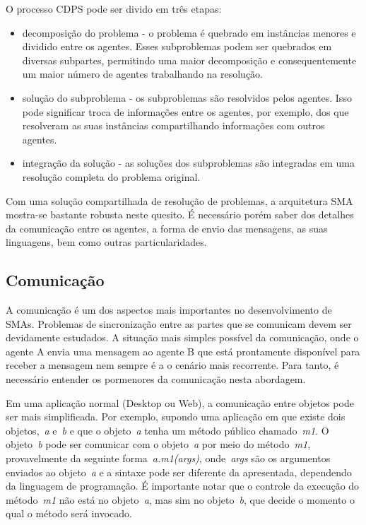O processo CDPS pode ser divido em três etapas:
\begin{itemize}
	\item decomposição do problema - o problema é quebrado em instâncias menores e dividido entre os agentes. Esses subproblemas podem ser quebrados em diversas subpartes, permitindo uma maior decomposição e consequentemente um maior número de agentes trabalhando na resolução.
	\item solução do subproblema - os subproblemas são resolvidos pelos agentes. Isso pode significar troca de informações entre os agentes, por exemplo, dos que resolveram as suas instâncias compartilhando informações com outros agentes.
	\item integração da solução - as soluções dos subproblemas são integradas em uma resolução completa do problema original.
\end{itemize}

Com uma solução compartilhada de resolução de problemas, a arquitetura SMA mostra-se bastante robusta neste quesito. É necessário porém saber dos detalhes da comunicação entre os agentes, a forma de envio das mensagens, as suas linguagens, bem como outras particularidades.

\subsection{Comunicação}

A comunicação é um dos aspectos mais importantes no desenvolvimento de SMAs. Problemas de sincronização entre as partes que se comunicam devem ser devidamente estudados. A situação mais simples possível da comunicação, onde o agente A envia uma mensagem ao agente B que está prontamente disponível para receber a mensagem nem sempre é a o cenário mais recorrente. Para tanto, é necessário entender os pormenores da comunicação nesta abordagem.

Em uma aplicação normal (Desktop ou Web), a comunicação entre objetos pode ser mais simplificada. Por exemplo, supondo uma aplicação em que existe dois objetos,~\emph{a} e~\emph{b} e que o objeto~\emph{a} tenha um método público chamado~\emph{m1}. O objeto~\emph{b} pode ser comunicar com o objeto~\emph{a} por meio do método~\emph{m1}, provavelmente da seguinte forma~\emph{a.m1(args)}, onde~\emph{args} são os argumentos enviados ao objeto~\emph{a} e a sintaxe pode ser diferente da apresentada, dependendo da linguagem de programação. É importante notar que o controle da execução do método~\emph{m1} não está no objeto~\emph{a}, mas sim no objeto~\emph{b}, que decide o momento o qual o método será invocado.

